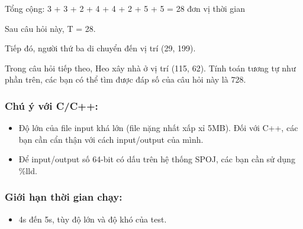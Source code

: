    Tổng cộng: 3 + 3 + 2 + 4 + 4 + 2 + 5 + 5 = 28 đơn vị thời gian  

   Sau câu hỏi này, T = 28.  

   Tiếp đó, người thứ ba di chuyển đến vị trí (29, 199).  

   Trong câu hỏi tiếp theo, Heo xây nhà ở vị trí (115, 62). Tính toán tương tự như phần trên, các bạn có thể tìm được đáp số của câu hỏi này là 728.  

\subsubsection{   Chú ý với C/C++:  }
\begin{itemize}
	\item     Độ lớn của file input khá lớn (file nặng nhất xấp xỉ 5MB). Đối với C++, các bạn cần cẩn thận với cách input/output của mình.   
	\item     Để input/output số 64-bit có dấu trên hệ thống SPOJ, các bạn cần sử dụng \%lld.   
\end{itemize}

\subsubsection{   Giới hạn thời gian chạy:  }
\begin{itemize}
	\item     4s đến 5s, tùy độ lớn và độ khó của test.   
\end{itemize}
